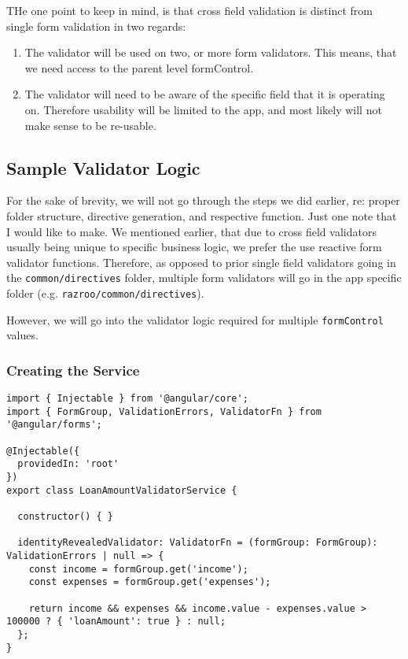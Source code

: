 THe one point to keep in mind, is that cross field validation is distinct 
from single form validation in two regards: 
\begin{enumerate}
  \item The validator will be used on two, or more form validators. This 
  means, that we need access to the parent level formControl.
  \item The validator will need to be aware of the specific field that it is
  operating on. Therefore usability will be limited to the app, and most likely
  will not make sense to be re-usable. 
\end{enumerate}


\subsection{Sample Validator Logic}
For the sake of brevity, we will not go through the steps we did earlier, re: 
proper folder structure, directive generation, and respective function. Just one 
note that I would like to make. We mentioned earlier, that due to cross field 
validators usually being unique to specific business logic, we prefer the use 
reactive form validator functions. Therefore, as opposed to prior single field 
validators going in the \lstinline{common/directives} folder, multiple form 
validators will go in the app specific folder (e.g. \lstinline{razroo/common/directives}).

However, we will go into the validator logic required for multiple \lstinline{formControl} 
values. 

\subsubsection{Creating the Service}

\begin{lstlisting}[caption=loan-amount-validator.ts]
import { Injectable } from '@angular/core';
import { FormGroup, ValidationErrors, ValidatorFn } from '@angular/forms';

@Injectable({
  providedIn: 'root'
})
export class LoanAmountValidatorService {

  constructor() { }

  identityRevealedValidator: ValidatorFn = (formGroup: FormGroup): ValidationErrors | null => {
    const income = formGroup.get('income');
    const expenses = formGroup.get('expenses');

    return income && expenses && income.value - expenses.value > 100000 ? { 'loanAmount': true } : null;
  };
}  
\end{lstlisting}

